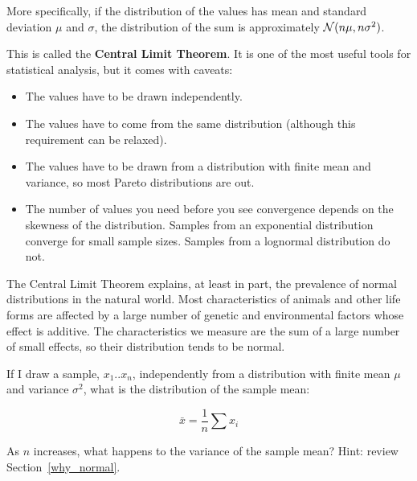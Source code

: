 \documentclass[12pt]{book}
\begin{document}
More specifically, if the distribution of the values has mean and
standard deviation $\mu$ and $\sigma$, the distribution of the sum is
approximately $\mathcal{N}(n \mu, n \sigma^2)$.

This is called the {\bf Central Limit Theorem}.  It is one of the
most useful tools for statistical analysis, but it comes with
caveats:

\begin{itemize}

\item The values have to be drawn independently.

\item The values have to come from the same distribution (although
  this requirement can be relaxed).

\item The values have to be drawn
  from a distribution with finite mean and variance, so most Pareto
  distributions are out.

\item The number of values you need before you see convergence depends
  on the skewness of the distribution.  Samples from an exponential
  distribution converge for small sample sizes.  Samples from a
  lognormal distribution do not.

\end{itemize}


The Central Limit Theorem explains, at least in part, the prevalence
of normal distributions in the natural world.  Most characteristics of
animals and other life forms are affected by a large number of genetic
and environmental factors whose effect is additive.  The characteristics
we measure are the sum of a large number of small effects, so their
distribution tends to be normal.

\begin{ex}

If I draw a sample, $x_1 .. x_n$, independently from a
distribution with finite mean $\mu$ and variance $\sigma^2$, what is
the distribution of the sample mean:

\newcommand{\xbar}{\bar{x}}

\[ \xbar = \frac{1}{n} \sum x_i \]

As $n$ increases, what happens to the variance of the sample mean?
Hint: review Section~\ref{why_normal}.

\end{ex}
\end{document}
